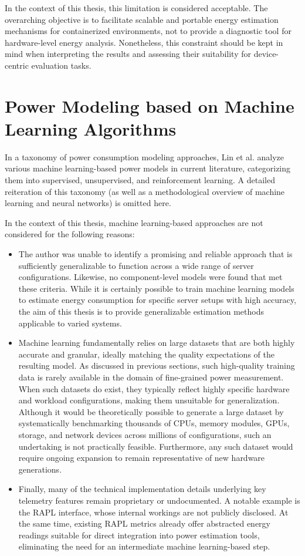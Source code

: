 In the context of this thesis, this limitation is considered acceptable. The overarching objective is to facilitate scalable and portable energy estimation mechanisms for containerized environments, not to provide a diagnostic tool for hardware-level energy analysis. Nonetheless, this constraint should be kept in mind when interpreting the results and assessing their suitability for device-centric evaluation tasks.

\section{Power Modeling based on Machine Learning Algorithms}

In a taxonomy of power consumption modeling approaches, Lin et al.\parencite{lin2020taxonomy} analyze various machine learning-based power models in current literature, categorizing them into supervised, unsupervised, and reinforcement learning. A detailed reiteration of this taxonomy (as well as a methodological overview of machine learning and neural networks) is omitted here.

In the context of this thesis, machine learning-based approaches are not considered for the following reasons:
\begin{itemize}
\item The author was unable to identify a promising and reliable approach that is sufficiently generalizable to function across a wide range of server configurations. Likewise, no component-level models were found that met these criteria. While it is certainly possible to train machine learning models to estimate energy consumption for specific server setups with high accuracy, the aim of this thesis is to provide generalizable estimation methods applicable to varied systems.
\item Machine learning fundamentally relies on large datasets that are both highly accurate and granular, ideally matching the quality expectations of the resulting model. As discussed in previous sections, such high-quality training data is rarely available in the domain of fine-grained power measurement. When such datasets do exist, they typically reflect highly specific hardware and workload configurations, making them unsuitable for generalization. Although it would be theoretically possible to generate a large dataset by systematically benchmarking thousands of CPUs, memory modules, GPUs, storage, and network devices across millions of configurations, such an undertaking is not practically feasible. Furthermore, any such dataset would require ongoing expansion to remain representative of new hardware generations.
\item Finally, many of the technical implementation details underlying key telemetry features remain proprietary or undocumented. A notable example is the RAPL interface, whose internal workings are not publicly disclosed. At the same time, existing RAPL metrics already offer abstracted energy readings suitable for direct integration into power estimation tools, eliminating the need for an intermediate machine learning-based step.
\end{itemize}

